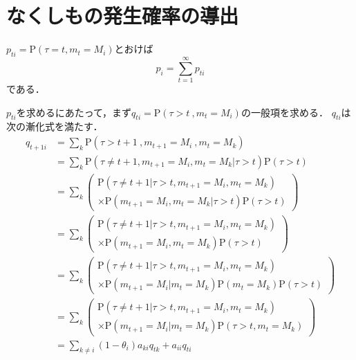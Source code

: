 \chapter{なくしもの発生確率の導出}

$ p_{t i} = \mathrm{P}(\tau = t , m_t = M_i) $とおけば
\begin{equation} \label{eq:p_sum_pt}
    p_i = \sum_{t=1}^{\infty}p_{t i}
\end{equation}
である．

$ p_{t i} $を求めるにあたって，まず$ q_{t i} = \mathrm{P}(\tau > t\ ,m_t = M_i) $の一般項を求める．
$ q_{t i} $は次の漸化式を満たす．
\begin{align*}
    q_{t+1 i} & = \! \sum_{k} \mathrm{P}(\tau \! > \! t + 1\ , m_{t+1} \! = \! M_i\ , m_t \! = \! M_k) \\
    & = \! \sum_{k} \mathrm{P}(\tau \! \ne \! t + 1 , m_{t+1} \! = \! M_i , m_t \! = \! M_k | \tau \! > \! t) \mathrm{P}(\tau \! > \! t) \\
    & = \! \sum_{k} \left(
        \begin{array}{l}
            \mathrm{P}(\tau \! \ne \! t + 1 | \tau \! > \! t , m_{t+1} \! = \! M_i , m_t \! = \! M_k) \\
            \times \mathrm{P}(m_{t+1} \! = \! M_i , m_t \! = \! M_k | \tau \! > \! t) \mathrm{P}(\tau \! > \! t)
        \end{array}
    \right) \\
    & = \! \sum_{k} \left(
        \begin{array}{l}
            \mathrm{P}(\tau \! \ne \! t + 1 | \tau \! > \! t , m_{t+1} \! = \! M_i , m_t \! = \! M_k) \\
            \times \mathrm{P}(m_{t+1} \! = \! M_i , m_t \! = \! M_k) \mathrm{P}(\tau \! > \! t)
        \end{array}
    \right) \\
    & = \! \sum_{k} \left(
        \begin{array}{l}
            \mathrm{P}(\tau \! \ne \! t + 1 | \tau \! > \! t , m_{t+1} \! = \! M_i , m_t \! = \! M_k) \\
            \times \mathrm{P}(m_{t+1} \! = \! M_i | m_t \! = \! M_k) \mathrm{P}(m_t \! = \! M_k) \mathrm{P}(\tau \! > \! t)
        \end{array}
    \right) \\
    & = \! \sum_{k} \left(
        \begin{array}{l}
            \mathrm{P}(\tau \! \ne \! t + 1 | \tau \! > \! t , m_{t+1} \! = \! M_i , m_t \! = \! M_k) \\
            \times \mathrm{P}(m_{t+1} \! = \! M_i | m_t \! = \! M_k) \mathrm{P}(\tau \! > \! t , m_t \! = \! M_k)
        \end{array}
    \right) \\
    & = \! \sum_{k \ne i} (1 - \theta_i) a_{k i} q_{t k} + a_{i i} q_{t i}
\end{align*}
